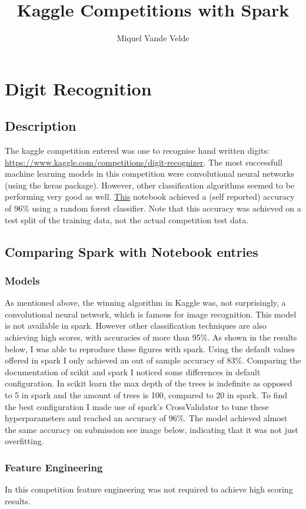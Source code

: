 \documentclass{article}
\title{Kaggle Competitions with Spark}
\author{Miquel Vande Velde}
\begin{document}
	\maketitle
	\section{Digit Recognition}
	\subsection{Description}
		The kaggle competition entered was one to recognise hand written digits: \url{https://www.kaggle.com/competitions/digit-recognizer}. The most successfull machine learning models in this competition were convolutional neural networks (using the keras package). However, other classification algorithms seemed to be performing very good as well. \href{https://www.kaggle.com/code/alphaghostusmc/mnist-randomforest}{This} notebook achieved a (self reported) accuracy of 96\% using a random forest classifier. Note that this accuracy was achieved on a test split of the training data, not the actual competition test data.
	\subsection{Comparing Spark with Notebook entries}
	\subsubsection{Models}
	As mentioned above, the winning algorithm in Kaggle was, not surprisingly, a convolutional neural network, which is famous for image recognition. This model is not available in spark. However other classification techniques are also achieving high scores, with accuracies of more than 95\%. 
	As shown in the results below, I was able to reproduce these figures with spark.
	Using the default values offered in spark I only achieved an out of sample accuracy of 83\%. Comparing the documentation of scikit and spark I noticed some differences in default configuration. In scikit learn the max depth of the trees is indefinite as opposed to 5 in spark and the amount of trees is 100, compared to 20 in spark. To find the best configuration I made use of spark's CrossValidator to tune these hyperparameters and reached an accuracy of 96\%. The model achieved almost the same accuracy on submission see image below, indicating that it was not just overfitting.
	\subsubsection{Feature Engineering}
	In this competition feature engineering was not required to achieve high scoring results.
	
\end{document}
